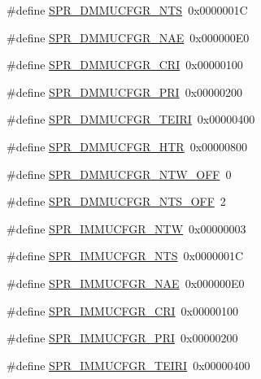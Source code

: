 \begin{DoxyCompactItemize}
\item 
\#define \hyperlink{spr-defs_8h_af061b903e5e1cee5049da7b4758406db}{\-S\-P\-R\-\_\-\-D\-M\-M\-U\-C\-F\-G\-R\-\_\-\-N\-T\-S}~0x0000001\-C
\item 
\#define \hyperlink{spr-defs_8h_aa3a0983bbdd9df8fbc50b91293114837}{\-S\-P\-R\-\_\-\-D\-M\-M\-U\-C\-F\-G\-R\-\_\-\-N\-A\-E}~0x000000\-E0
\item 
\#define \hyperlink{spr-defs_8h_a71d37a52ae036c544991764d88d754c8}{\-S\-P\-R\-\_\-\-D\-M\-M\-U\-C\-F\-G\-R\-\_\-\-C\-R\-I}~0x00000100
\item 
\#define \hyperlink{spr-defs_8h_af4d4e04f32a10be7a296755ae8813247}{\-S\-P\-R\-\_\-\-D\-M\-M\-U\-C\-F\-G\-R\-\_\-\-P\-R\-I}~0x00000200
\item 
\#define \hyperlink{spr-defs_8h_a97156d07f93fd7631c80058549a55cc6}{\-S\-P\-R\-\_\-\-D\-M\-M\-U\-C\-F\-G\-R\-\_\-\-T\-E\-I\-R\-I}~0x00000400
\item 
\#define \hyperlink{spr-defs_8h_a732535e30278c014b7591f2da3990517}{\-S\-P\-R\-\_\-\-D\-M\-M\-U\-C\-F\-G\-R\-\_\-\-H\-T\-R}~0x00000800
\item 
\#define \hyperlink{spr-defs_8h_aa48f3bc2f6153afaf8bb60d01c696c30}{\-S\-P\-R\-\_\-\-D\-M\-M\-U\-C\-F\-G\-R\-\_\-\-N\-T\-W\-\_\-\-O\-F\-F}~0
\item 
\#define \hyperlink{spr-defs_8h_a2409ed649d16337ec24f65f57eb18721}{\-S\-P\-R\-\_\-\-D\-M\-M\-U\-C\-F\-G\-R\-\_\-\-N\-T\-S\-\_\-\-O\-F\-F}~2
\item 
\#define \hyperlink{spr-defs_8h_a1de143ada02c0606e288322b023e99af}{\-S\-P\-R\-\_\-\-I\-M\-M\-U\-C\-F\-G\-R\-\_\-\-N\-T\-W}~0x00000003
\item 
\#define \hyperlink{spr-defs_8h_a8dbe6cac8b60056ad4c2eb112a235a7f}{\-S\-P\-R\-\_\-\-I\-M\-M\-U\-C\-F\-G\-R\-\_\-\-N\-T\-S}~0x0000001\-C
\item 
\#define \hyperlink{spr-defs_8h_a0895b9f9f5804ee6aac7e305b1607234}{\-S\-P\-R\-\_\-\-I\-M\-M\-U\-C\-F\-G\-R\-\_\-\-N\-A\-E}~0x000000\-E0
\item 
\#define \hyperlink{spr-defs_8h_a8650ae5b6120ad82a1f45d770ebbd8c6}{\-S\-P\-R\-\_\-\-I\-M\-M\-U\-C\-F\-G\-R\-\_\-\-C\-R\-I}~0x00000100
\item 
\#define \hyperlink{spr-defs_8h_a32faf2f7dbb3b15d17c830337d6a1a06}{\-S\-P\-R\-\_\-\-I\-M\-M\-U\-C\-F\-G\-R\-\_\-\-P\-R\-I}~0x00000200
\item 
\#define \hyperlink{spr-defs_8h_a2379dd8453d509e7b0cfb3c3afaf9ced}{\-S\-P\-R\-\_\-\-I\-M\-M\-U\-C\-F\-G\-R\-\_\-\-T\-E\-I\-R\-I}~0x00000400
\item 

\end{DoxyCompactItemize}
